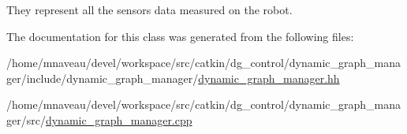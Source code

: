 They represent all the sensors data measured on the robot. 

The documentation for this class was generated from the following files\+:\begin{DoxyCompactItemize}
\item 
/home/mnaveau/devel/workspace/src/catkin/dg\+\_\+control/dynamic\+\_\+graph\+\_\+manager/include/dynamic\+\_\+graph\+\_\+manager/\hyperlink{dynamic__graph__manager_8hh}{dynamic\+\_\+graph\+\_\+manager.\+hh}\item 
/home/mnaveau/devel/workspace/src/catkin/dg\+\_\+control/dynamic\+\_\+graph\+\_\+manager/src/\hyperlink{dynamic__graph__manager_8cpp}{dynamic\+\_\+graph\+\_\+manager.\+cpp}\end{DoxyCompactItemize}
